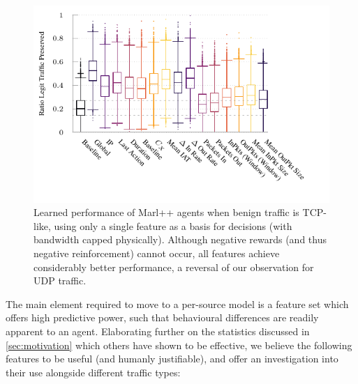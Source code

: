 \documentclass[conference, letterpaper, 10pt, times]{IEEEtran}
\begin{document}
\begin{figure}
	\centering
	\includegraphics[width=\linewidth]{../plots/ftprep-tcp-cap-box}
	\vspace{-1.2cm}
	\caption{
		Learned performance of Marl++ agents when benign traffic is TCP-like, using only a single feature as a basis for decisions (with bandwidth capped physically).
		Although negative rewards (and thus negative reinforcement) cannot occur, all features achieve considerably better performance, a reversal of our observation for UDP traffic.
		\label{fig:tcp-cap-feature-plots}
	}
\end{figure}

The main element required to move to a per-source model is a feature set which offers high predictive power, such that behavioural differences are readily apparent to an agent.
Elaborating further on the statistics discussed in \cref{sec:motivation} which others have shown to be effective, we believe the following features to be useful (and humanly justifiable), and offer an investigation into their use alongside different traffic types:
\end{document}
